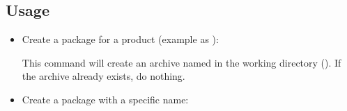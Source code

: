 \documentclass[a4paper,10pt,english]{sphinxmanual}
\begin{document}
\subsection{Usage}
\label{\detokenize{commands/package:usage}}\begin{itemize}
\item {} 
Create a package for a product (example as ):

%
\begin{sphinxVerbatim}[commandchars=\\\{\}]
  
\end{sphinxVerbatim}

This command will create an archive named 
in the working directory ().
If the archive already exists, do nothing.

\item {} 
Create a package with a specific name:

%
\begin{sphinxVerbatim}[commandchars=\\\{\}]
    
\end{sphinxVerbatim}

\end{itemize}
\end{document}
